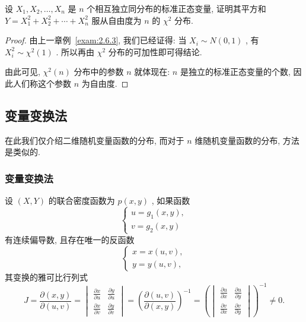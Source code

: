    \begin{example}
   	设 $X_1,X_2,\ldots,X_n$ 是 $n$ 个相互独立同分布的标准正态变量, 证明其平方和 $Y=X_1^2+X_2^2+\cdots+X_n^2$ 服从自由度为 $n$ 的 $\chi^2$ 分布.
   	\begin{proof}
   		由上一章例~\ref{exam:2.6.3}, 我们已经证得: 当 $X_i\sim N(0,1)$ , 有 $X_i^2\sim\chi^2(1)$ . 所以再由 $\chi^2$ 分布的可加性即可得结论.
   		
   		由此可见, $\chi^2(n)$ 分布中的参数 $n$ 就体现在: $n$ 是独立的标准正态变量的个数, 因此人们称这个参数 $n$ 为自由度.
   	\end{proof}
   \end{example}
    
    \subsection{变量变换法}\label{ssec:3.3.4}
    在此我们仅介绍二维随机变量函数的分布, 而对于 $n$ 维随机变量函数的分布, 方法是类似的.
    \subsubsection{变量变换法}
    设 $(X,Y)$ 的联合密度函数为 $p(x,y)$ , 如果函数
    \begin{equation*}
    	\begin{cases}
    	u=g_{1}(x,y),\\
    	v=g_{2}(x,y)
    	\end{cases}
    \end{equation*}
    有连续偏导数, 且存在唯一的反函数
    \begin{equation*}
    	\begin{cases}
    	x=x(u,v),\\
    	y=y(u,v),
    	\end{cases}
    \end{equation*}
    其变换的雅可比行列式
    \begin{equation}\label{eq:3.3.19}
    	J=\frac{\partial(x,y)}{\partial(u,v)}=
    	\begin{vmatrix}
    	\frac{\partial x}{\partial u} & \frac{\partial y}{\partial u}\\
    	\frac{\partial x}{\partial v} & \frac{\partial y}{\partial v}
    	\end{vmatrix}=
    	\left( \frac{\partial(u,v)}{\partial(x,y)}
    	\right) ^{-1}=
    	\left( 
    	\begin{vmatrix}
    	\frac{\partial u}{\partial x} & \frac{\partial u}{\partial y}\\
    	\frac{\partial v}{\partial x} & \frac{\partial v}{\partial y}
    	\end{vmatrix}
    	\right) ^{-1}\ne0.
    \end{equation}
    
